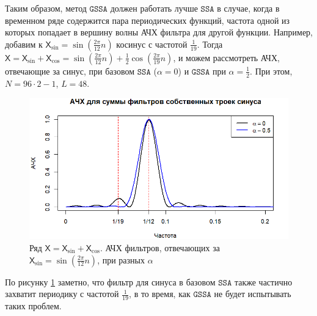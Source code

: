 \documentclass[12pt, specialist, subf
]{disser}
\theoremstyle{definition}
\newcommand{\SSA}{\texttt{SSA}}
\newcommand{\GSSA}{\texttt{GSSA}}
\newcommand{\TS}{\mathsf{X}}
\begin{document}
Таким образом, метод $\GSSA$ должен работать лучше $\SSA$ в случае, когда в временном ряде содержится пара периодических функций, частота одной из которых попадает в вершину волны АЧХ фильтра для другой функции. Например, добавим к $\TS_{\sin} = \sin\left(\frac{2\pi}{12} n \right)$ косинус с частотой $\frac{1}{19}$. Тогда $\TS = \TS_{\sin} + \TS_{\cos} = \sin\left(\frac{2\pi}{12} n \right) + \frac{1}{2}\cos\left(\frac{2\pi}{19} n \right)$, и можем рассмотреть АЧХ, отвечающие за синус, при базовом $\SSA$ ($\alpha = 0$) и $\GSSA$ при $\alpha = \frac{1}{2}$. При этом, $N = 96 \cdot 2 - 1$, $L = 48$.

\begin{figure}[H]
	\centering
	\includegraphics[width=1\textwidth]{img/various_alphas_sin_cos.png}
	\caption{Ряд $\TS = \TS_{\sin} + \TS_{\cos}$. АЧХ фильтров, отвечающих за $\TS_{\sin} = \sin\left(\frac{2\pi}{12} n \right)$, при разных $\alpha$}
	\label{fig:various_alphas_sin_cos}
\end{figure}

По рисунку \ref{fig:various_alphas_sin_cos} заметно, что фильтр для синуса в базовом $\SSA$ также частично захватит периодику с частотой $\frac{1}{19}$, в то время, как $\GSSA$ не будет испытывать таких проблем. 
\end{document}
